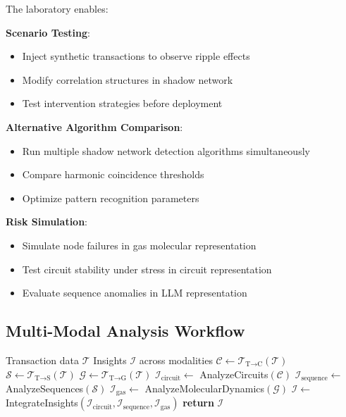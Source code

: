 \documentclass[12pt]{article}
\begin{document}
The laboratory enables:

\textbf{Scenario Testing}:
\begin{itemize}
    \item Inject synthetic transactions to observe ripple effects
    \item Modify correlation structures in shadow network
    \item Test intervention strategies before deployment
\end{itemize}

\textbf{Alternative Algorithm Comparison}:
\begin{itemize}
    \item Run multiple shadow network detection algorithms simultaneously
    \item Compare harmonic coincidence thresholds
    \item Optimize pattern recognition parameters
\end{itemize}

\textbf{Risk Simulation}:
\begin{itemize}
    \item Simulate node failures in gas molecular representation
    \item Test circuit stability under stress in circuit representation
    \item Evaluate sequence anomalies in LLM representation
\end{itemize}

\subsection{Multi-Modal Analysis Workflow}

\begin{algorithm}
\caption{Multi-Modal Financial Analysis}
\begin{algorithmic}[1]
\REQUIRE Transaction data $\mathcal{T}$
\ENSURE Insights $\mathcal{I}$ across modalities
\STATE $\mathcal{C} \leftarrow \mathcal{T}_{\text{T→C}}(\mathcal{T})$ 
\STATE $\mathcal{S} \leftarrow \mathcal{T}_{\text{T→S}}(\mathcal{T})$ 
\STATE $\mathcal{G} \leftarrow \mathcal{T}_{\text{T→G}}(\mathcal{T})$ 
\STATE
\STATE $\mathcal{I}_{\text{circuit}} \leftarrow$ AnalyzeCircuits$(\mathcal{C})$
\STATE $\mathcal{I}_{\text{sequence}} \leftarrow$ AnalyzeSequences$(\mathcal{S})$
\STATE $\mathcal{I}_{\text{gas}} \leftarrow$ AnalyzeMolecularDynamics$(\mathcal{G})$
\STATE
\STATE $\mathcal{I} \leftarrow$ IntegrateInsights$(\mathcal{I}_{\text{circuit}}, \mathcal{I}_{\text{sequence}}, \mathcal{I}_{\text{gas}})$
\STATE \textbf{return} $\mathcal{I}$
\end{algorithmic}
\end{algorithm}
\end{document}
